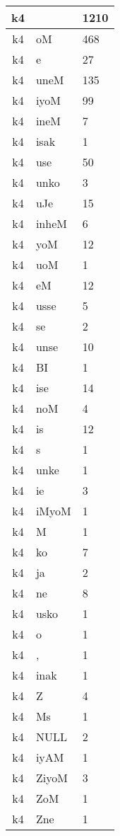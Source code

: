 \documentclass[a4 paper]{article}
\begin{document}
\begin{longtable}{cp{}p{}}
k4 &  & 1210\\ \midrule k4 & oM & 468\\ \midrule k4 & e & 27\\ \midrule k4 & uneM & 135\\ \midrule k4 & iyoM & 99\\ \midrule k4 & ineM & 7\\ \midrule k4 & isak & 1\\ \midrule k4 & use & 50\\ \midrule k4 & unko & 3\\ \midrule k4 & uJe & 15\\ \midrule k4 & inheM & 6\\ \midrule k4 & yoM & 12\\ \midrule k4 & uoM & 1\\ \midrule k4 & eM & 12\\ \midrule k4 & usse & 5\\ \midrule k4 & se & 2\\ \midrule k4 & unse & 10\\ \midrule k4 & BI & 1\\ \midrule k4 & ise & 14\\ \midrule k4 & noM & 4\\ \midrule k4 & is & 12\\ \midrule k4 & s & 1\\ \midrule k4 & unke & 1\\ \midrule k4 & ie & 3\\ \midrule k4 & iMyoM & 1\\ \midrule k4 & M & 1\\ \midrule k4 & ko & 7\\ \midrule k4 & ja & 2\\ \midrule k4 & ne & 8\\ \midrule k4 & usko & 1\\ \midrule k4 & o & 1\\ \midrule k4 & , & 1\\ \midrule k4 & inak & 1\\ \midrule k4 & Z & 4\\ \midrule k4 & Ms & 1\\ \midrule k4 & NULL & 2\\ \midrule k4 & iyAM & 1\\ \midrule k4 & ZiyoM & 3\\ \midrule k4 & ZoM & 1\\ \midrule k4 & Zne & 1\\ \midrule 

\end{longtable}
\end{document}

